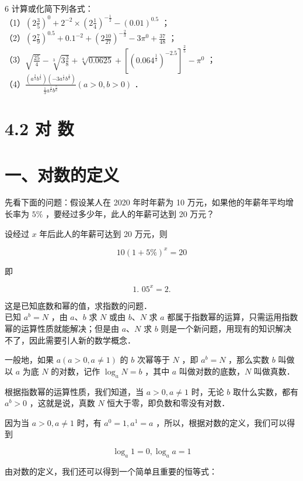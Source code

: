 \documentclass[10pt]{article}
\begin{document}
6 计算或化简下列各式：\\
（1）\(\left(2 \frac{3}{5}\right)^{0}+2^{-2} \times\left(2 \frac{1}{4}\right)^{-\frac{1}{2}}-(0.01)^{0.5}\) ；\\
（2）\(\left(2 \frac{7}{9}\right)^{0.5}+0.1^{-2}+\left(2 \frac{10}{27}\right)^{-\frac{2}{3}}-3 \pi^{0}+\frac{37}{48}\) ；\\
（3）\(\sqrt{\frac{25}{4}}-\sqrt[3]{3 \frac{3}{8}}+\sqrt[4]{0.0625}+\left[\left(0.064^{\frac{1}{3}}\right)^{-2.5}\right]^{\frac{2}{5}}-\pi^{0}\) ；\\
（4）\(\frac{\left(a^{\frac{2}{3}} b^{\frac{1}{2}}\right)\left(-3 a^{\frac{1}{2}} b^{\frac{1}{3}}\right)}{\frac{1}{3} a^{\frac{1}{6}} b^{\frac{5}{6}}}(a>0, b>0)\) ．

\section*{4.2 对 数}
\section*{一、对数的定义}
先看下面的问题：假设某人在 2020 年时年薪为 10 万元，如果他的年薪年平均增长率为 \(5 \%\) ，要经过多少年，此人的年薪可达到 20 万元？

设经过 \(x\) 年后此人的年薪可达到 20 万元，则

\[
10(1+5 \%)^{x}=20
\]

即

\[
\text { 1. } 05^{x}=2 \text {. }
\]

这是已知底数和幂的值，求指数的问题．\\
已知 \(a^{b}=N\) ，由 \(a 、 b\) 求 \(N\) 或由 \(b 、 N\) 求 \(a\) 都属于指数幂的运算，只需运用指数幂的运算性质就能解决；但是由 \(a 、 N\) 求 \(b\) 则是一个新问题，用现有的知识解决不了，因此需要引人新的数学概念．

一般地，如果 \(a(a>0, a \neq 1)\) 的 \(b\) 次幂等于 \(N\) ，即 \(a^{b}=N\) ，那么实数 \(b\) 叫做以 \(a\) 为底 \(N\) 的对数，记作 \(\log _{a} N=b\) ，其中 \(a\) 叫做对数的底数，\(N\) 叫做真数．

根据指数幂的运算性质，我们知道，当 \(a>0, a \neq 1\) 时，无论 \(b\) 取什么实数，都有 \(a^{b}>0\) ，这就是说，真数 \(N\) 恒大于零，即负数和零没有对数．

因为当 \(a>0, a \neq 1\) 时，有 \(a^{0}=1, a^{1}=a\) ，所以，根据对数的定义，我们可以得到

\[
\log _{a} 1=0, \log _{a} a=1
\]

由对数的定义，我们还可以得到一个简单且重要的恒等式：
\end{document}

